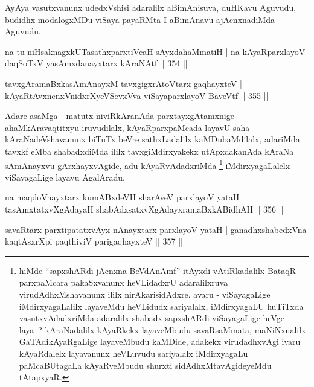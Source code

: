 \begin{artha}
AyAya vasutxvanunx udedxVshisi adaralilx aBimAnisuva, duHKavu Aguvudu, budidhx modalogxMDu viSaya payaRMta I aBimAnavu ajAcnxnadiMda Aguvudu.
\end{artha}


\begin{shl}
na tu niHsaknagxkUTasathxparxtiVcaH sAyxdahaMmatiH |
na kAyaRparxlayoV daqSoTxV yasAmxdanayxtarx kAraNAtf \hfill || 354 ||
\end{shl}

\begin{shl}
tavxgAramaBxkasAmAnayxM tavxgigxrA\s toV\s tarx gaqhayxteV |
kAyaRtAvxnenxVnidxrXyeVSevxVva viSayaparxlayoV BaveVtf \hfill || 355 ||
\end{shl}

\begin{artha}
Adare asaMga - matutx niviRkAranAda parxtayxgAtamxnige ahaMkAravaqtitxyu iruvudilalx, kAyaRparxpaMcada layavU saha kAraNadeVshavanunx biTuTx beVre sathxLadalilx kaMDubaMdilalx, adariMda tavxkf eMba shabadxdiMda ililx tavxgiMdirxyakekx utApxdakanAda kAraNa sAmAnayxvu gArxhayxvAgide, adu kAyaRvAdadxriMda \footnote[1]{hiMde ``sapxshARdi jAcnxna BeVdAnAmf'' itAyxdi vAtiRkadalilx BataqR parxpaMcara pakaSxvanunx heVLidadxrU adaralilxruva virudAdhxMshavanunx ililx nirAkarisidAdxre. avaru - viSayagaLige iMdirxyagaLalilx layaveMdu heVLidudx sariyalalx, iMdirxyagaLU huTiTxda vasutxvAdadxriMda adaralilx shabadx sapxshARdi viSayagaLige heVge laya~? kAraNadalilx kAyaRkekx layaveMbudu savaRsaMmata, maNiNxnalilx GaTAdikAyaRgaLige layaveMbudu kaMDide, adakekx virudadhxvAgi ivaru kAyaRdalelx layavanunx heVLuvudu sariyalalx iMdirxyagaLu paMcaBUtagaLa kAyaRveMbudu shurxti sidAdhxMtavAgideyeMdu tAtapxyaR.} iMdirxyagaLalelx viSayagaLige layavu AgalAradu.
\end{artha}

\begin{shl}
na maqdoV\s nayxtarx kumABxdeVH sharAveV parxlayoV yataH |
tasAmxtatxvXgAdayaH shabAdxsatxvXgAdayxramaBxkABidhAH \hfill || 356 ||
\end{shl}

\begin{shl}
savaRtarx parxtipatatxvAyx nAnayxtarx parxlayoV yataH |
ganadhxshabedxVna kaqtAsxrX\s pi paqthiviV parigaqhayxteV \hfill || 357 ||
\end{shl}


